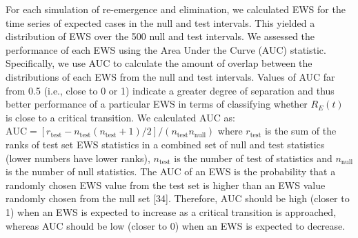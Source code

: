 \documentclass[3p]{elsarticle} %
\begin{document}
For each simulation of re-emergence and elimination, we calculated EWS
for the time series of expected cases in the null and test intervals.
This yielded a distribution of EWS over the 500 null and test intervals.
We assessed the performance of each EWS using the Area Under the Curve
(AUC) statistic. Specifically, we use AUC to calculate the amount of
overlap between the distributions of each EWS from the null and test
intervals. Values of AUC far from 0.5 (i.e., close to 0 or 1) indicate a
greater degree of separation and thus better performance of a particular
EWS in terms of classifying whether \(R_E(t)\) is close to a critical
transition. We calculated AUC as:
\(\text{AUC} = \left[r_{\text{test}} - n_\text{test} \left(n_{\text{test}}+1\right)/2\right] / \left(n_{\text{test}}n_{\text{null}}\right)\)
where \(r_{\text{test}}\) is the sum of the ranks of test set EWS
statistics in a combined set of null and test statistics (lower numbers
have lower ranks), \(n_{\text{test}}\) is the number of test of
statistics and \(n_{\text{null}}\) is the number of null statistics. The
AUC of an EWS is the probability that a randomly chosen EWS value from
the test set is higher than an EWS value randomly chosen from the null
set {[}34{]}. Therefore, AUC should be high (closer to 1) when an EWS is
expected to increase as a critical transition is approached, whereas AUC
should be low (closer to 0) when an EWS is expected to decrease.
\end{document}
